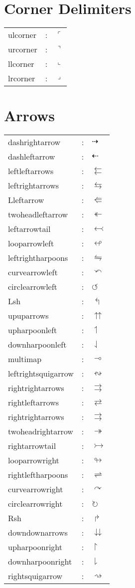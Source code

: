 \documentclass{article}
\begin{document}
\section{Corner Delimiters}
\begin{tabular}{lll} 
ulcorner & : & $\ulcorner$\\
urcorner & : & $\urcorner$\\
llcorner & : & $\llcorner$\\
lrcorner & : & $\lrcorner$
\end{tabular}

\section{Arrows}
\begin{tabular}{lll} 
dashrightarrow & : & $\dashrightarrow$\\
dashleftarrow & : & $\dashleftarrow$\\
leftleftarrows & : & $\leftleftarrows$\\
leftrightarrows & : & $\leftrightarrows$\\
Lleftarrow & : & $\Lleftarrow$\\
twoheadleftarrow & : & $\twoheadleftarrow$\\
leftarrowtail & : & $\leftarrowtail$\\
looparrowleft & : & $\looparrowleft$\\
leftrightharpoons & : & $\leftrightharpoons$\\
curvearrowleft & : & $\curvearrowleft$\\
circlearrowleft & : & $\circlearrowleft$\\
Lsh & : & $\Lsh$\\
upuparrows & : & $\upuparrows$\\
upharpoonleft & : & $\upharpoonleft$\\
downharpoonleft & : & $\downharpoonleft$\\
multimap & : & $\multimap$\\
leftrightsquigarrow & : & $\leftrightsquigarrow$\\
rightrightarrows & : & $\rightrightarrows$\\
rightleftarrows & : & $\rightleftarrows$\\
rightrightarrows & : & $\rightrightarrows$\\
twoheadrightarrow & : & $\twoheadrightarrow$\\
rightarrowtail & : & $\rightarrowtail$\\
looparrowright & : & $\looparrowright$\\
rightleftharpoons & : & $\rightleftharpoons$\\
curvearrowright & : & $\curvearrowright$\\
circlearrowright & : & $\circlearrowright$\\
Rsh & : & $\Rsh$\\
downdownarrows & : & $\downdownarrows$\\
upharpoonright & : & $\upharpoonright$\\
downharpoonright & : & $\downharpoonright$\\
rightsquigarrow & : & $\rightsquigarrow$
\end{tabular}
\end{document}
